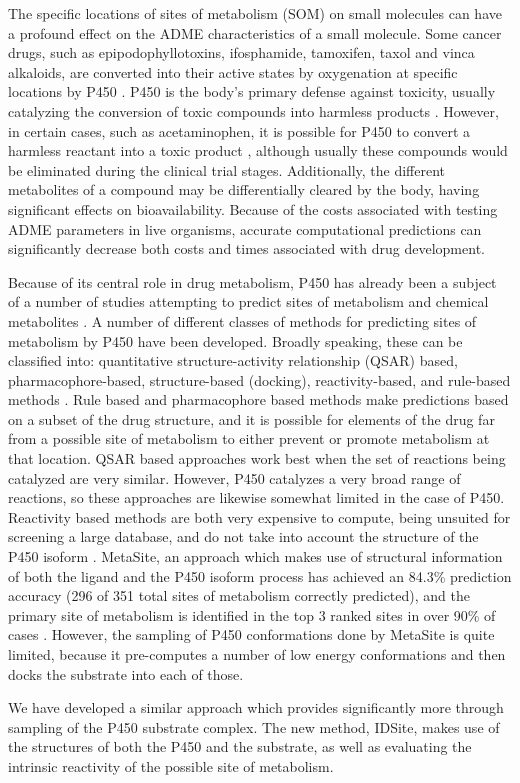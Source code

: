 The specific locations of sites of metabolism (SOM) on small molecules can have a profound effect on the ADME characteristics of a small molecule.
Some cancer drugs, such as epipodophyllotoxins, ifosphamide, tamoxifen, taxol and vinca alkaloids, are converted into their active states by oxygenation at specific locations by P450 \cite{kivisto1995role}.
P450 is the body's primary defense against toxicity, usually catalyzing the conversion of toxic compounds into harmless products \cite{gonzalez2005role,guengerich2001common}.
However, in certain cases, such as acetaminophen, it is possible for P450 to convert a harmless reactant into a toxic product \cite{chen1998oxidation}, although usually these compounds would be eliminated during the clinical trial stages.
Additionally, the different metabolites of a compound may be differentially cleared by the body, having significant effects on bioavailability.
Because of the costs associated with testing ADME parameters in live organisms, accurate computational predictions can significantly decrease both costs and times associated with drug development.

Because of its central role in drug metabolism, P450 has already been a subject of a number of studies attempting to predict sites of metabolism and chemical metabolites \cite{afzelius2007state}.
A number of different classes of methods for predicting sites of metabolism by P450 have been developed.
Broadly speaking, these can be classified into: quantitative structure-activity relationship (QSAR) based, pharmacophore-based, structure-based (docking), reactivity-based, and rule-based methods \cite{cruciani2005metasite}.
Rule based and pharmacophore based methods make predictions based on a subset of the drug structure, and it is possible for elements of the drug far from a possible site of metabolism to either prevent or promote metabolism at that location.
QSAR based approaches work best when the set of reactions being catalyzed are very similar.
However, P450 catalyzes a very broad range of reactions, so these approaches are likewise somewhat limited in the case of P450.
Reactivity based methods are both very expensive to compute, being unsuited for screening a large database, and do not take into account the structure of the P450 isoform \cite{singh2003model,chen1997oxidative,de2002factors}.
MetaSite, an approach which makes use of structural information of both the ligand and the P450 isoform process has achieved an 84.3\% prediction accuracy (296 of 351 total sites of metabolism correctly predicted), and the primary site of metabolism is identified in the top 3 ranked sites in over 90\% of cases \cite{cruciani2005metasite}.
However, the sampling of P450 conformations done by MetaSite is quite limited, because it pre-computes a number of low energy conformations and then docks the substrate into each of those.

We have developed a similar approach which provides significantly more through sampling of the P450 substrate complex.
The new method, IDSite, makes use of the structures of both the P450 and the substrate, as well as evaluating the intrinsic reactivity of the possible site of metabolism. 
